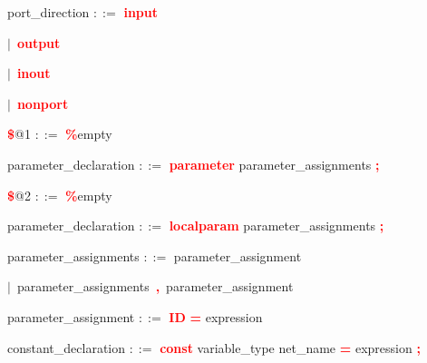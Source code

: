 \vspace{1em}
\noindent
\settowidth{\parindent}{\hspace{4ex}}
port\_direction $::=$\hspace{1ex} \textbf{\textcolor{red}{input}}

\mbox{$|$ \textbf{\textcolor{red}{output}}}

\mbox{$|$ \textbf{\textcolor{red}{inout}}}

\mbox{$|$ \textbf{\textcolor{red}{nonport}}}

\vspace{1em}
\noindent
\settowidth{\parindent}{\hspace{4ex}}
\textbf{\textcolor{red}{\$}}@1 $::=$\hspace{1ex} \textbf{\textcolor{red}{\%}}empty

\vspace{1em}
\noindent
\settowidth{\parindent}{\hspace{4ex}}
parameter\_declaration $::=$\hspace{1ex} \textbf{\textcolor{red}{parameter}} parameter\_assignments \textbf{\textcolor{red}{;}}

\vspace{1em}
\noindent
\settowidth{\parindent}{\hspace{4ex}}
\textbf{\textcolor{red}{\$}}@2 $::=$\hspace{1ex} \textbf{\textcolor{red}{\%}}empty

\vspace{1em}
\noindent
\settowidth{\parindent}{\hspace{4ex}}
parameter\_declaration $::=$\hspace{1ex} \textbf{\textcolor{red}{localparam}} parameter\_assignments \textbf{\textcolor{red}{;}}

\vspace{1em}
\noindent
\settowidth{\parindent}{\hspace{4ex}}
parameter\_assignments $::=$\hspace{1ex} parameter\_assignment

\mbox{$|$ parameter\_assignments \textbf{\textcolor{red}{,}} parameter\_assignment}

\vspace{1em}
\noindent
\settowidth{\parindent}{\hspace{4ex}}
parameter\_assignment $::=$\hspace{1ex} \textbf{\textcolor{red}{ID}} \textbf{\textcolor{red}{=}} expression

\vspace{1em}
\noindent
\settowidth{\parindent}{\hspace{4ex}}
constant\_declaration $::=$\hspace{1ex} \textbf{\textcolor{red}{const}} variable\_type net\_name \textbf{\textcolor{red}{=}} expression \textbf{\textcolor{red}{;}}

